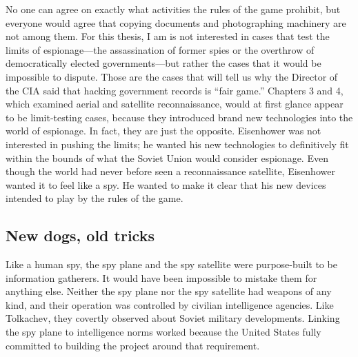 \documentclass{report}
\begin{document}


No one can agree on exactly what activities the rules of the game prohibit, but everyone would agree that copying documents and photographing machinery are not among them. For this thesis, I am is not interested in cases that test the limits of espionage---the assassination of former spies or the overthrow of democratically elected governments---but rather the cases that it would be impossible to dispute. Those are the cases that will tell us why the Director of the CIA said that hacking government records is ``fair game.'' Chapters 3 and 4, which examined aerial and satellite reconnaissance, would at first glance appear to be limit-testing cases, because they introduced brand new technologies into the world of espionage. In fact, they are just the opposite. Eisenhower was not interested in pushing the limits; he wanted his new technologies to definitively fit within the bounds of what the Soviet Union would consider espionage. Even though the world had never before seen a reconnaissance satellite, Eisenhower wanted it to feel like a spy. He wanted to make it clear that his new devices intended to play by the rules of the game.

\subsection{New dogs, old tricks}
Like a human spy, the spy plane and the spy satellite were purpose-built to be information gatherers. It would have been impossible to mistake them for anything else. Neither the spy plane nor the spy satellite had weapons of any kind, and their operation was controlled by civilian intelligence agencies. Like Tolkachev, they covertly observed about Soviet military developments. Linking the spy plane to intelligence norms worked because the United States fully committed to building the project around that requirement.
\end{document}
